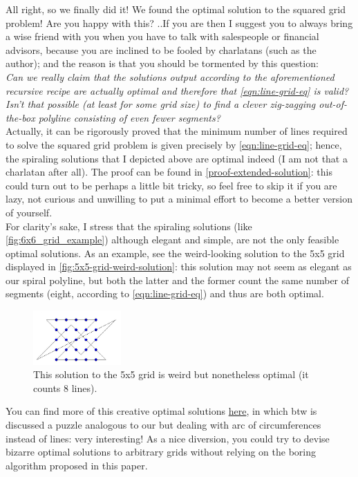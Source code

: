 \documentclass[11pt]{article}
\begin{document}
All right, so we finally did it! We found the optimal solution to the squared grid problem! Are you happy with this? ..If you are then I suggest you to always bring a wise friend with you when you have to talk with salespeople or financial advisors, because you are inclined to be fooled by charlatans (such as the author); and the reason is that you should be tormented by this question:\\
\emph{Can we really claim that the solutions output according to the aforementioned recursive recipe are actually optimal and therefore that \autoref{eqn:line-grid-eq} is valid? Isn't that possible (at least for some grid size) to find a clever zig-zagging out-of-the-box polyline consisting of even fewer segments?}\\
Actually, it can be rigorously proved that the minimum number of lines required to solve the squared grid problem is given precisely by \autoref{eqn:line-grid-eq}; hence, the spiraling solutions that I depicted above are optimal indeed (I am not that a charlatan after all). The proof can be found in \autoref{proof-extended-solution}: this could turn out to be perhaps a little bit tricky, so feel free to skip it if you are lazy, not curious and unwilling to put a minimal effort to become a better version of yourself.\\
For clarity's sake, I stress that the spiraling solutions (like \autoref{fig:6x6_grid_example}) although elegant and simple, are not the only feasible optimal solutions. As an example, see the weird-looking solution to the 5x5 grid displayed in \autoref{fig:5x5-grid-weird-solution}: this solution may not seem as elegant as our spiral polyline, but both the latter and the former count the same number of segments (eight, according to \autoref{eqn:line-grid-eq}) and thus are both optimal.
\begin{figure}[H]
\centering
\includegraphics[width=0.3\textwidth]{images/5x5-grid-weird-solution.png}
\caption{This solution to the 5x5 grid is weird but nonetheless optimal (it counts 8 lines).} %
\label{fig:5x5-grid-weird-solution}
\end{figure}
You can find more of this creative optimal solutions \href{http://www.mathpuzzle.com/dots.html}{here}, in which btw is discussed a puzzle analogous to our but dealing with arc of circumferences instead of lines: very interesting! As a nice diversion, you could try to devise bizarre optimal solutions to arbitrary grids without relying on the boring algorithm proposed in this paper.
\end{document}
